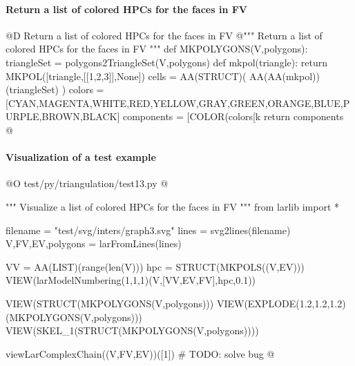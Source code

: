 \documentclass[11pt,oneside]{article}    %
\begin{document}
\paragraph{Return a list of colored HPCs for the faces in FV}
@D Return a list of colored HPCs for the faces in FV 
@{""" Return a list of colored HPCs for the faces in FV """
def MKPOLYGONS(V,polygons):
    triangleSet = polygons2TriangleSet(V,polygons)
    def mkpol(triangle): return MKPOL([triangle,[[1,2,3]],None])
    cells = AA(STRUCT)( AA(AA(mkpol))(triangleSet) )
    colors = [CYAN,MAGENTA,WHITE,RED,YELLOW,GRAY,GREEN,ORANGE,BLUE,PURPLE,BROWN,BLACK]
    components = [COLOR(colors[k%
    return components
@}

\paragraph{Visualization of a test example}
@O test/py/triangulation/test13.py 
@{""" Visualize a list of colored HPCs for the faces in FV """
from larlib import *
    
filename = "test/svg/inters/graph3.svg"
lines = svg2lines(filename)
V,FV,EV,polygons = larFromLines(lines)

VV = AA(LIST)(range(len(V)))
hpc = STRUCT(MKPOLS((V,EV)))        
VIEW(larModelNumbering(1,1,1)(V,[VV,EV,FV],hpc,0.1))

VIEW(STRUCT(MKPOLYGONS(V,polygons)))
VIEW(EXPLODE(1.2,1.2,1.2)(MKPOLYGONS(V,polygons)))
VIEW(SKEL_1(STRUCT(MKPOLYGONS(V,polygons))))

viewLarComplexChain((V,FV,EV))([1])  # TODO: solve bug
@}
\end{document}
